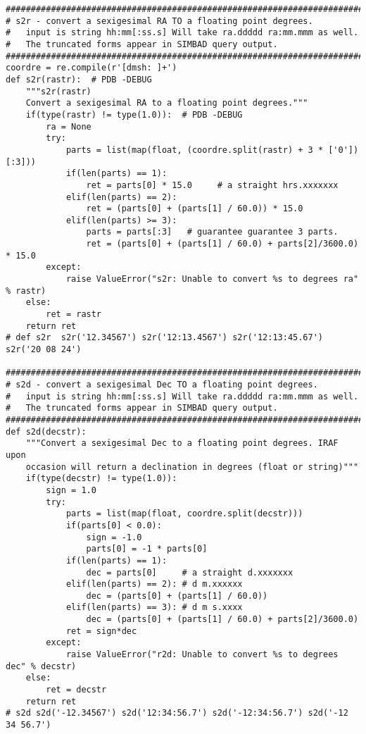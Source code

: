 {\begin{verbatim}
##############################################################################
# s2r - convert a sexigesimal RA TO a floating point degrees.
#   input is string hh:mm[:ss.s] Will take ra.ddddd ra:mm.mmm as well.
#   The truncated forms appear in SIMBAD query output.
##############################################################################
coordre = re.compile(r'[dmsh: ]+')
def s2r(rastr):  # PDB -DEBUG
    """s2r(rastr)
    Convert a sexigesimal RA to a floating point degrees."""
    if(type(rastr) != type(1.0)):  # PDB -DEBUG
        ra = None
        try:
            parts = list(map(float, (coordre.split(rastr) + 3 * ['0']) [:3]))
            if(len(parts) == 1):
                ret = parts[0] * 15.0     # a straight hrs.xxxxxxx
            elif(len(parts) == 2):
                ret = (parts[0] + (parts[1] / 60.0)) * 15.0
            elif(len(parts) >= 3):
                parts = parts[:3]   # guarantee guarantee 3 parts.
                ret = (parts[0] + (parts[1] / 60.0) + parts[2]/3600.0) * 15.0
        except:
            raise ValueError("s2r: Unable to convert %s to degrees ra" % rastr)
    else:
        ret = rastr
    return ret
# def s2r  s2r('12.34567') s2r('12:13.4567') s2r('12:13:45.67') s2r('20 08 24')

##############################################################################
# s2d - convert a sexigesimal Dec TO a floating point degrees.
#   input is string hh:mm[:ss.s] Will take ra.ddddd ra:mm.mmm as well.
#   The truncated forms appear in SIMBAD query output.
##############################################################################
def s2d(decstr):
    """Convert a sexigesimal Dec to a floating point degrees. IRAF upon
    occasion will return a declination in degrees (float or string)"""
    if(type(decstr) != type(1.0)):
        sign = 1.0
        try:
            parts = list(map(float, coordre.split(decstr)))
            if(parts[0] < 0.0):
                sign = -1.0
                parts[0] = -1 * parts[0]
            if(len(parts) == 1):
                dec = parts[0]     # a straight d.xxxxxxx
            elif(len(parts) == 2): # d m.xxxxxx
                dec = (parts[0] + (parts[1] / 60.0))
            elif(len(parts) == 3): # d m s.xxxx
                dec = (parts[0] + (parts[1] / 60.0) + parts[2]/3600.0)
            ret = sign*dec
        except:
            raise ValueError("r2d: Unable to convert %s to degrees dec" % decstr)
    else:
        ret = decstr
    return ret
# s2d s2d('-12.34567') s2d('12:34:56.7') s2d('-12:34:56.7') s2d('-12 34 56.7')


\end{verbatim}}
